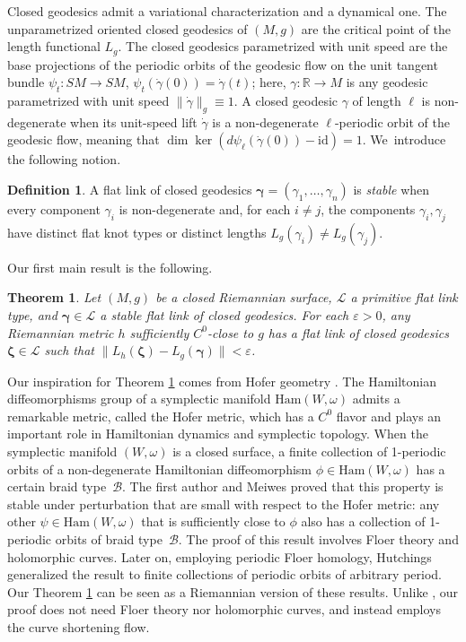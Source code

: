 \documentclass[11pt]{article}
\let\epsilon\varepsilon
\let\bm\boldsymbol
\newcommand{\R}{\mathbb{R}}
\newcommand{\LL}{\mathcal{L}}
\newcommand{\id}{\mathrm{id}}
\theoremstyle{plain}
\newtheorem{MainThm}{Theorem}
\theoremstyle{definition}
\newtheorem{Definition}[Thm]{Definition}
\begin{document}
Closed geodesics admit a variational characterization and a dynamical one. The unparametrized oriented closed geodesics of $(M,g)$ are the critical point of the length functional $L_g$. The closed geodesics parametrized with unit speed are the base projections of the periodic orbits of the geodesic flow on the unit tangent bundle \hbox{$\psi_t:SM\to SM$}, $\psi_t(\dot\gamma(0))=\dot\gamma(t)$; here, $\gamma:\R\to M$ is any geodesic parametrized with unit speed $\|\dot\gamma\|_g\equiv1$. A closed geodesic $\gamma$ of length $\ell$ is non-degenerate when its unit-speed lift $\dot\gamma$ is a non-degenerate $\ell$-periodic orbit of the geodesic flow, meaning that $\dim\ker(d\psi_\ell(\dot\gamma(0))-\id)=1$. We~introduce the following notion.

\begin{Definition}\label{d:stable_link}
A flat link of closed geodesics $\bm\gamma=(\gamma_1,\dots,\gamma_n)$ is \emph{stable} when every component $\gamma_i$ is non-degenerate and, for each $i\neq j$, the components $\gamma_i,\gamma_j$ have distinct flat knot types or distinct lengths $L_g(\gamma_i)\neq L_g(\gamma_j)$.\end{Definition}

Our first main result is the following.

\begin{MainThm}\label{mt:links}
Let $(M,g)$ be a closed Riemannian surface, $\LL$ a primitive flat link type, and $\bm\gamma\in\LL$ a stable flat link of closed geodesics. For each $\epsilon>0$, any Riemannian metric $h$ sufficiently $C^0$-close to $g$ has a flat link of closed geodesics $\bm\zeta\in\LL$ such that $\|L_h(\bm\zeta)- L_g(\bm\gamma)\|<\epsilon$.
\end{MainThm}

Our inspiration for Theorem \ref{mt:links} comes from Hofer geometry \cite{Hofer:1990aa, Polterovich:2001aa}. The Hamiltonian diffeomorphisms group of a symplectic manifold $\mathrm{Ham}(W,\omega)$ admits a remarkable metric, called the Hofer metric, which has a $C^0$ flavor and plays an important role in Hamiltonian dynamics and symplectic topology. When the symplectic manifold $(W,\omega)$ is a closed surface,
a finite collection of 1-periodic orbits of a non-degenerate Hamiltonian diffeomorphism $\phi\in\mathrm{Ham}(W,\omega)$ has a certain braid type~$\mathcal B$. The first author and Meiwes \cite{Alves:2021aa} proved that this property is stable under perturbation that are small with respect to the Hofer metric: any other $\psi\in\mathrm{Ham}(W,\omega)$ that is sufficiently close to $\phi$ also has a collection of 1-periodic orbits of braid type~$\mathcal B$. The proof of this result involves Floer theory and holomorphic curves. Later on, employing periodic Floer homology, Hutchings \cite{Hutchings:2023aa} generalized the result to finite collections of periodic orbits of arbitrary period.
Our Theorem \ref{mt:links} can be seen as a Riemannian version of these results. Unlike \cite{Alves:2021aa, Hutchings:2023aa}, our proof does not need Floer theory nor holomorphic curves, and instead employs the curve shortening flow.
\end{document}
